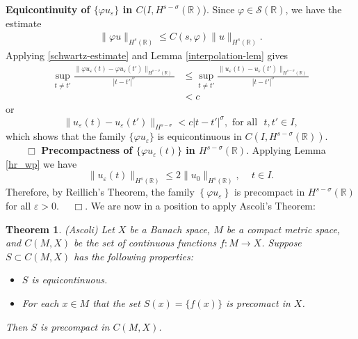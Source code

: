 \documentclass[12pt,reqno]{amsart}
\newcommand{\nin}{\noindent}
\newcommand{\rr}{\mathbb{R}}
\newcommand{\ee}{\varepsilon}
\newcommand{\vp}{\varphi}
\theoremstyle{plain}  %
\newtheorem{theorem}{Theorem}
\theoremstyle{definition}
\begin{document}
		


		\vskip0.1in
		\nin
		{\bf  Equicontinuity of $\{ \varphi u_\ee\}$  in $C(I, H^{s-\sigma}(\rr)$}).
		Since $\varphi \in \mathcal{S}(\rr)$, we have the estimate
		\begin{equation}
			\begin{split}
				\|\varphi u\|_{H^s(\rr)} \le C(s, \varphi) \|u\|_{H^s(\rr)}.
				\label{schwartz-estimate}
			\end{split}
		\end{equation}
		Applying  \eqref{schwartz-estimate} and Lemma
		\ref{interpolation-lem} 
		gives 
		\begin{equation*}
			\begin{split}
			\label{equic-1}
			\sup_{t \neq t'} \frac { \| \varphi u_\ee(t) - \varphi u_\ee(t') \|_{H^{s -
			\sigma }(\rr)}}{|t - t'|^{\sigma }}
			& \le \sup_{t \neq t'} \frac { \| u_\ee(t) - u_\ee(t') \|_{H^{s -
			\sigma }(\rr)}}{|t - t'|^{\sigma }}
			\\
			&< c
		\end{split}
		\end{equation*}
		or
		\begin{equation*}
			\label{equic-2}
			\|u_\ee(t) - u_\ee(t') \|_{H^{s - \sigma}}< c|t -
			t'|^{\sigma }, 
			\text{ for all }  \,\,  t, t'\in I,
		\end{equation*}
		which shows that  the family  $\{\vp u_\ee\}$ is equicontinuous in 
		$C(I, H^{s-\sigma }(\rr))$.  $\qquad \Box$
		\vskip0.1in
		\nin
		{\bf Precompactness of $\{\vp u_\ee (t)\}$ in $H^{s-\sigma
		}(\rr)$}.
		Applying Lemma \ref{hr_wp} we have
		\begin{equation*}
			\label{compact-1}
			\|u_\ee(t)\|_{H^{s}(\rr)}
			\le
			2 \|u_0 \|_{H^s(\rr)}, \,
			\quad
			t\in I.
		\end{equation*}
		Therefore, by Reillich's Theorem, the family $\left\{ \varphi u_\ee \right\}$ is
		precompact in $H^{s- \sigma}(\rr)$ for all $\ee > 0$. $\quad
		\Box$. 
		\vskip0.1in
		We are now in a position to apply Ascoli's Theorem: 
		\begin{theorem}
			\label{Ascoli}
			(Ascoli)  Let $X$ be a Banach space, $M$ be a compact metric space,
			and $C(M,X)$  be the set of continuous functions $f: M\longrightarrow X$.
			Suppose $S \subset C(M,X)$  has the following properties:
			\begin{itemize}
				\item[(1)]   $S$ is  equicontinuous.
				\item[(2)]  For each $x \in M$ that the set $S(x) = \{f(x)\}$  is  precomact in $X$.
			\end{itemize} 
			Then $S$  is  precompact  in  $C(M,X)$.
		\end{theorem}
\end{document}
